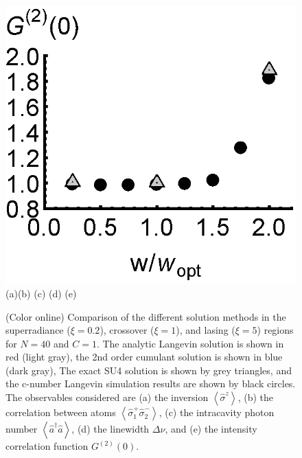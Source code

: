 \documentclass[aps,prl,twocolumn,
superscriptaddress,groupedaddress]{revtex4}
\begin{document}
\begin{figure}
\begin{center}
	\hspace{-5.0mm} \includegraphics[scale =0.38] {N40LaserG2.eps}\\ \vspace{1mm}
	\hspace{5mm}(a)\hspace{30mm}(b) \hspace{30mm}(c) \hspace{30mm}(d) \hspace{30mm}(e)
\end{center}
		\vspace{-5mm}
\caption{(Color online) Comparison of the different solution methods in
the superradiance ($\xi=0.2$), crossover ($\xi=1$), and lasing ($\xi=5$)
regions for $N=40$ and $C=1$.  The analytic Langevin solution is shown
in red (light gray), the 2nd order cumulant solution is shown in blue
(dark gray), The exact SU4 solution is shown by grey triangles, and the
c-number Langevin simulation results are shown by black circles. The
observables considered are (a) the inversion
$\left<\hat{\sigma}^{z}\right>$, (b) the correlation between atoms
$\left<\hat{\sigma}_{1}^{+} \hat{\sigma}_{2}^{-}\right>$, (c) the
intracavity photon number  $\left<\hat{a}^{\dagger}\hat{a}\right>$, (d)
the linewidth $\Delta \nu$, and (e) the intensity correlation function
$G^{(2)}(0)$.}
\label{N40Comparison}
\end{figure}
\end{document}
